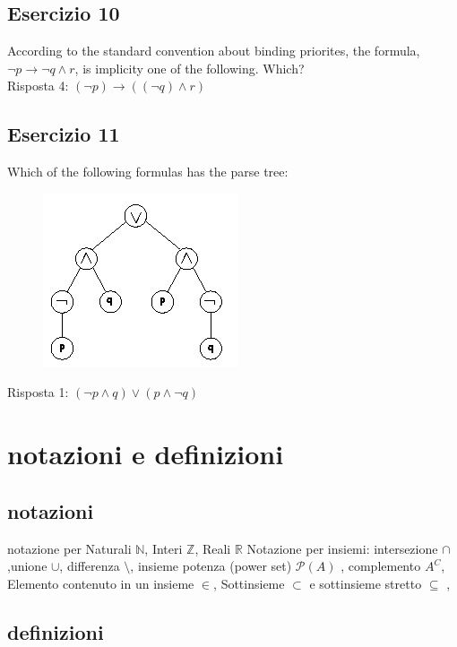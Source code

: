 \documentclass[a4paper]{article}
\begin{document}
\subsection{Esercizio 10}
According to the standard convention about binding priorites, the formula, $ \lnot p \rightarrow \lnot q \land r $, is implicity one of the following. Which?\\
Risposta 4: $ ( \lnot p) \rightarrow (( \lnot q) \land r) $
\subsection{Esercizio 11}
Which of the following formulas has the parse tree:\\
\begin{figure}[H]
	\centering
	\includegraphics[scale = 0.5]{parsetree.jpg}
\end{figure}
Risposta 1: $ ( \lnot p \land q) \lor (p \land \lnot q) $

\section{notazioni e definizioni}
\subsection{notazioni}		
notazione per Naturali $ \mathbb{N} $, Interi $ \mathbb{Z} $, Reali $ \mathbb{R} $
\newline
Notazione per insiemi:
intersezione $\cap$ ,unione $\cup$, differenza $\setminus$, insieme potenza (power set) $\mathcal{P}
(A)$ , complemento $A^{C}$, Elemento contenuto in un insieme $ \in $, Sottinsieme $ \subset $ e sottinsieme stretto $ \subseteq $ ,

\subsection{definizioni}
\end{document}
